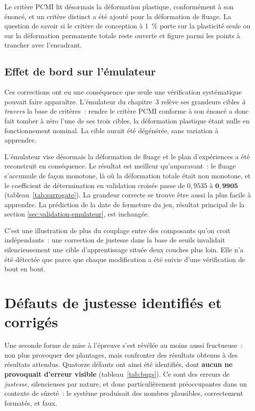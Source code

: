 \documentclass[12pt,a4paper,french]{report}
\begin{document}
Le critère PCMI lit désormais la déformation plastique, conformément à son
énoncé, et un critère distinct a été ajouté pour la déformation de fluage. La
question de savoir si le critère de conception à \SI{1}{\percent} porte sur la
plasticité seule ou sur la déformation permanente totale reste ouverte et
figure parmi les points à trancher avec l'encadrant.

\subsection{Effet de bord sur l'émulateur}

Ces corrections ont eu une conséquence que seule une vérification systématique
pouvait faire apparaître. L'émulateur du chapitre~3 relève ses grandeurs cibles
\emph{à travers} la base de critères~: rendre le critère PCMI conforme à son
énoncé a donc fait tomber à zéro l'une de ses trois cibles, la déformation
plastique étant nulle en fonctionnement nominal. La cible aurait été dégénérée,
sans variation à apprendre.

L'émulateur vise désormais la déformation de fluage et le plan d'expériences a
été reconstruit en conséquence. Le résultat est meilleur qu'auparavant~: le
fluage s'accumule de façon monotone, là où la déformation totale était non
monotone, et le coefficient de détermination en validation croisée passe de
$0{,}9535$ à $\mathbf{0{,}9905}$ (tableau~\ref{tab:surrogate}). La grandeur
correcte se trouve être aussi la plus facile à apprendre. La prédiction de la
date de fermeture du jeu, résultat principal de la section
\ref{sec:validation-emulateur}, est inchangée.

C'est une illustration de plus du couplage entre des composants qu'on croit
indépendants~: une correction de justesse dans la base de seuils invalidait
silencieusement une cible d'apprentissage située deux couches plus loin. Elle
n'a été détectée que parce que chaque modification a été suivie d'une
vérification de bout en bout.

\section{Défauts de justesse identifiés et corrigés}
\label{sec:bugs}

Une seconde forme de mise à l'épreuve s'est révélée au moins aussi fructueuse~:
non plus provoquer des plantages, mais confronter des résultats obtenus à des
résultats attendus. Quatorze défauts ont ainsi été identifiés, dont \textbf{aucun
ne provoquait d'erreur visible} (tableau~\ref{tab:bugs}). Ce sont des erreurs
de \textit{justesse}, silencieuses par nature, et donc particulièrement
préoccupantes dans un contexte de sûreté~: le système produisait des nombres
plausibles, correctement formatés, et faux.
\end{document}
